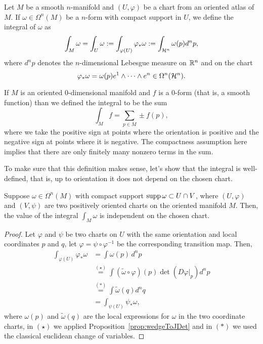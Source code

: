 \begin{definition}\label{def:intnform:chart}
  Let $M$ be a smooth $n$-manifold and $(U,\varphi)$ be a chart from an oriented atlas of $M$.
  If $\omega\in\Omega^n(M)$ be a $n$-form with compact support in $U$, we define the integral of $\omega$ as
  \begin{equation}
    \int_M \omega = \int_U \omega := \int_{\varphi(U)} \varphi_*\omega := \int_{\mathcal{H}^n} \omega(p) d^n p,
  \end{equation}
  where $d^n p$ denotes the $n$-dimensional Lebesgue measure on $\mathbb{R}^n$ and on the chart
  \begin{equation}
    \varphi_*\omega = \omega(p) e^1\wedge \cdots\wedge e^n\in\Omega^n(\mathcal{H}^n).
  \end{equation}

  If $M$ is an oriented $0$-dimensional manifold and $f$ is a $0$-form (that is, a smooth function) than we defined the integral to be the sum
  \begin{equation}
    \int_M f = \sum_{p\in M} \pm f(p),
  \end{equation}
  where we take the positive sign at points where the orientation is positive and the negative sign at points where it is negative.
  The compactness assumption here implies that there are only finitely many nonzero terms in the sum.
\end{definition}

To make sure that this definition makes sense, let's show that the integral is well-defined, that is, up to orientation it does not depend on the chosen chart.

\begin{lemma}\label{lemma:intindep:chart}
  Suppose $\omega\in\Omega^n(M)$ with compact support $\operatorname{supp} \omega \subset U\cap V$, where $(U, \varphi)$ and $(V, \psi)$ are two positively oriented charts on the oriented manifold $M$.
  Then, the value of the integral $\int_M\omega$ is independent on the chosen chart.
\end{lemma}
\begin{proof}
  Let $\varphi$ and $\psi$ be two charts on $U$ with the same orientation and local coordinates $p$ and $q$, let $\varphi = \psi\circ\varphi^{-1}$ be the corresponding transition map.
  Then,
  \begin{align}
    \int_{\varphi(U)} \varphi_*\omega &= \int \omega(p)\, d^n p \\
    &\overset{(\star)}{=} \int (\widetilde\omega \circ \varphi)(p) \det(D\varphi|_p) d^n p \\
    &\overset{(*)}{=} \int \widetilde\omega(q) d^n q\\
    &= \int_{\psi(U)} \psi_*\omega,
  \end{align}
  where $\omega(p)$ and $\widetilde\omega(q)$ are the local expressions for $\omega$ in the two coordinate charts, in $(\star)$ we applied Proposition~\ref{prop:wedgeToJDet} and in $(*)$ we used the classical euclidean change of variables.
\end{proof}

